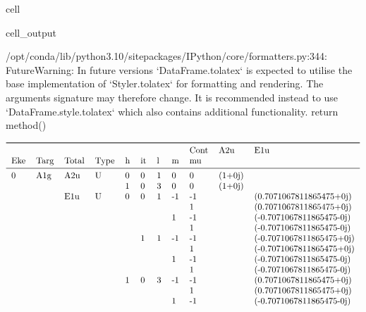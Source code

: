 \documentclass[letterpaper,table,10pt,english]{jupyterBook}
\begin{document}
\begin{sphinxuseclass}{cell}
\begin{sphinxVerbatimOutput}
\begin{sphinxuseclass}{cell_output}
\begin{sphinxVerbatim}[commandchars=\\\{\}]
/opt/conda/lib/python3.10/site\PYGZhy{}packages/IPython/core/formatters.py:344: FutureWarning: In future versions `DataFrame.to\PYGZus{}latex` is expected to utilise the base implementation of `Styler.to\PYGZus{}latex` for formatting and rendering. The arguments signature may therefore change. It is recommended instead to use `DataFrame.style.to\PYGZus{}latex` which also contains additional functionality.
  return method()
\end{sphinxVerbatim}
\begin{equation*}
\begin{split}\begin{tabular}{lllllllllll}
\toprule
  &     &     &   &   &   &   &    & Cont &     A2u &                       E1u \\
Eke & Targ & Total & Type & h & it & l & m & mu &         &                           \\
\midrule
0 & A1g & A2u & U & 0 & 0 & 1 &  0 &  0 &  (1+0j) &                           \\
  &     &     &   & 1 & 0 & 3 &  0 &  0 &  (1+0j) &                           \\
  &     & E1u & U & 0 & 0 & 1 & -1 & -1 &         &   (0.7071067811865475+0j) \\
  &     &     &   &   &   &   &    &  1 &         &   (0.7071067811865475+0j) \\
  &     &     &   &   &   &   &  1 & -1 &         &  (-0.7071067811865475-0j) \\
  &     &     &   &   &   &   &    &  1 &         &  (-0.7071067811865475-0j) \\
  &     &     &   &   & 1 & 1 & -1 & -1 &         &  (-0.7071067811865475+0j) \\
  &     &     &   &   &   &   &    &  1 &         &  (-0.7071067811865475+0j) \\
  &     &     &   &   &   &   &  1 & -1 &         &  (-0.7071067811865475-0j) \\
  &     &     &   &   &   &   &    &  1 &         &  (-0.7071067811865475-0j) \\
  &     &     &   & 1 & 0 & 3 & -1 & -1 &         &   (0.7071067811865475+0j) \\
  &     &     &   &   &   &   &    &  1 &         &   (0.7071067811865475+0j) \\
  &     &     &   &   &   &   &  1 & -1 &         &  (-0.7071067811865475-0j) \\

\end{tabular}
\end{split}
\end{equation*}
\end{sphinxuseclass}
\end{sphinxVerbatimOutput}
\end{sphinxuseclass}
\end{document}
